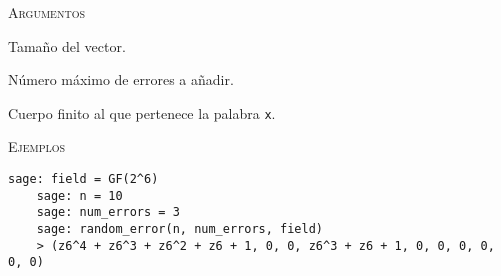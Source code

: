 \begin{description}[leftmargin=1em, font=\normalfont\ttfamily, style=nextline]
  \textsc{Argumentos}
  \begin{description}[font=\normalfont\ttfamily]
    \item[n] Tamaño del vector.
    \item[num\_errors] Número máximo de errores a añadir.
    \item[field] Cuerpo finito al que pertenece la palabra \texttt{x}.
  \end{description}

  \textsc{Ejemplos}
  \begin{lstlisting}[gobble=4]
    sage: field = GF(2^6)
    sage: n = 10
    sage: num_errors = 3
    sage: random_error(n, num_errors, field)
    > (z6^4 + z6^3 + z6^2 + z6 + 1, 0, 0, z6^3 + z6 + 1, 0, 0, 0, 0, 0, 0)
  \end{lstlisting}
\end{description}